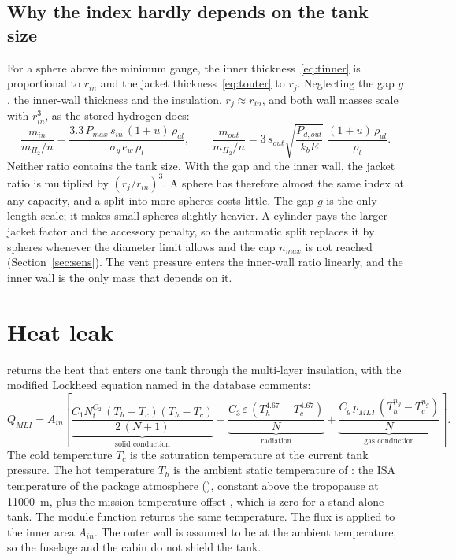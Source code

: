 \documentclass[a4paper,11pt]{article}
\newcommand{\Qmli}{Q_{MLI}}
\begin{document}
\subsection{Why the index hardly depends on the tank size}\label{sec:scaling}
For a sphere above the minimum gauge, the inner thickness~\eqref{eq:tinner} is proportional
to $r_{in}$ and the jacket thickness~\eqref{eq:touter} to $r_j$. Neglecting the gap $g$, the
inner-wall thickness and the insulation, $r_j \approx r_{in}$, and both wall masses scale with
$r_{in}^3$, as the stored hydrogen does:
\begin{equation}
  \frac{m_{in}}{m_{H_2}/n} = \frac{3.3\,P_{max}\,s_{in}\,(1+u)\,\rho_{al}}{\sigma_y\,e_w\,\rho_l},
  \qquad
  \frac{m_{out}}{m_{H_2}/n} = 3\,s_{out}\sqrt{\frac{P_{d,out}}{k_b E}}\;\frac{(1+u)\,\rho_{al}}{\rho_l}.
  \label{eq:scaling}
\end{equation}
Neither ratio contains the tank size. With the gap and the inner wall, the jacket ratio is
multiplied by $(r_j/r_{in})^3$. A sphere has therefore almost the same index at any
capacity, and a split into more spheres costs little. The gap $g$ is the only length
scale; it makes small spheres slightly heavier. A cylinder pays the larger jacket factor and the
accessory penalty, so the automatic split replaces it by spheres whenever the diameter limit
allows and the cap $n_{max}$ is not reached (Section~\ref{sec:sens}). The vent pressure enters the inner-wall ratio linearly, and the
inner wall is the only mass that depends on it.

\section{Heat leak}\label{sec:leak}

 returns the heat that enters one tank through
the multi-layer insulation, with the modified Lockheed equation named in the database comments:
\begin{equation}
  \Qmli = A_{in}\left[
  \underbrace{\frac{C_1 N_t^{C_2}\,(T_h + T_c)(T_h - T_c)}{2\,(N+1)}}_{\text{solid conduction}}
  + \underbrace{\frac{C_3\,\varepsilon\,(T_h^{4.67} - T_c^{4.67})}{N}}_{\text{radiation}}
  + \underbrace{\frac{C_g\,p_{MLI}\,(T_h^{n_g} - T_c^{n_g})}{N}}_{\text{gas conduction}}
  \right].
  \label{eq:leak}
\end{equation}
The cold temperature $T_c$ is the saturation temperature at the current tank pressure. The hot
temperature $T_h$ is the ambient static temperature of :
the ISA temperature of the package atmosphere (),
constant above the tropopause at \SI{11000}{m}, plus the mission temperature offset
, which is zero for a stand-alone tank. The module function
 returns the same temperature. The flux is
applied to the inner area $A_{in}$. The outer wall is assumed to be at the ambient temperature, so
the fuselage and the cabin do not shield the tank.
\end{document}
